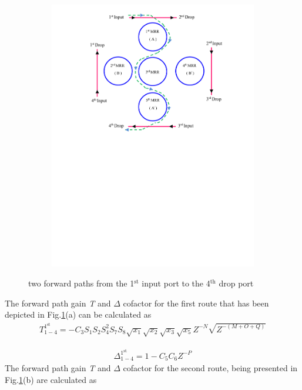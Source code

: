 \documentclass{osa-article}
\begin{document}
\begin{figure}[h!]
\begin{subfigure}[b]{0.4\linewidth}
    \includegraphics[width=\linewidth]{figs/fig3a_142.pdf}
    \caption{}
  \end{subfigure}
  \caption{two forward paths from the 1$^{\text{st}}$ input port to the 4$^{\text{th}}$ drop port}
  \label{fig3a}
\end{figure}

The forward path gain \textit {T} and $\Delta$ cofactor for the first route that has been depicted in Fig.\ref{fig3a}(a) can be calculated as\\

\begin{equation}
\begin{split}
T^{1^{\text{st}}}_{1-4}=-C_3S_1S_2{S^2_{4}}S_7S_8\sqrt{x_1}\sqrt{x_2}\sqrt{x_3}\sqrt{x_5}Z^{-N}\sqrt{Z^{-(M+O+Q)}}
 \label{eqa52}
\end{split}
\end{equation}

\begin{equation}
\begin{split}
\Delta^{1^{\text{st}}}_{1-4}=1-C_5C_6Z^{-P}
 \label{eqa53}
\end{split}
\end{equation}
The forward path gain \textit {T} and $\Delta$ cofactor for the second route, being presented in Fig.\ref{fig3a}(b) are calculated as
\end{document}
